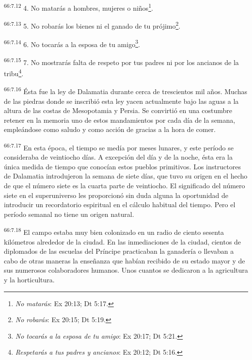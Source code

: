 \par
\textsuperscript{66:7.12} 4. No matarás a hombres, mujeres o niños\footnote{\textit{No matarás}: Ex 20:13; Dt 5:17.}.

\par
\textsuperscript{66:7.13} 5. No robarás los bienes ni el ganado de tu prójimo\footnote{\textit{No robarás}: Ex 20:15; Dt 5:19.}.

\par
\textsuperscript{66:7.14} 6. No tocarás a la esposa de tu amigo\footnote{\textit{No tocarás a la esposa de tu amigo}: Ex 20:17; Dt 5:21.}.

\par
\textsuperscript{66:7.15} 7. No mostrarás falta de respeto por tus padres ni por los ancianos de la tribu\footnote{\textit{Respetarás a tus padres y ancianos}: Ex 20:12; Dt 5:16.}.

\par
\textsuperscript{66:7.16} Ésta fue la ley de Dalamatia durante cerca de trescientos mil años. Muchas de las piedras donde se inscribió esta ley yacen actualmente bajo las aguas a la altura de las costas de Mesopotamia y Persia. Se convirtió en una costumbre retener en la memoria uno de estos mandamientos por cada día de la semana, empleándose como saludo y como acción de gracias a la hora de comer.

\par
\textsuperscript{66:7.17} En esta época, el tiempo se medía por meses lunares, y este período se consideraba de veintiocho días. A excepción del día y de la noche, ésta era la única medida de tiempo que conocían estos pueblos primitivos. Los instructores de Dalamatia introdujeron la semana de siete días, que tuvo su origen en el hecho de que el número siete es la cuarta parte de veintiocho. El significado del número siete en el superuniverso les proporcionó sin duda alguna la oportunidad de introducir un recordatorio espiritual en el cálculo habitual del tiempo. Pero el período semanal no tiene un origen natural.

\par
\textsuperscript{66:7.18} El campo estaba muy bien colonizado en un radio de ciento sesenta kilómetros alrededor de la ciudad. En las inmediaciones de la ciudad, cientos de diplomados de las escuelas del Príncipe practicaban la ganadería o llevaban a cabo de otras maneras la enseñanza que habían recibido de su estado mayor y de sus numerosos colaboradores humanos. Unos cuantos se dedicaron a la agricultura y la horticultura.

